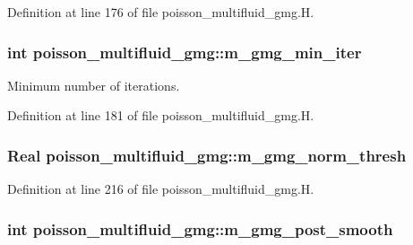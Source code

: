 Definition at line 176 of file poisson\+\_\+multifluid\+\_\+gmg.\+H.

\subsubsection[{\texorpdfstring{m\+\_\+gmg\+\_\+min\+\_\+iter}{m_gmg_min_iter}}]{\setlength{\rightskip}{0pt plus 5cm}int poisson\+\_\+multifluid\+\_\+gmg\+::m\+\_\+gmg\+\_\+min\+\_\+iter\hspace{0.3cm}{\ttfamily [protected]}}\hypertarget{classpoisson__multifluid__gmg_afbd5549164a894e68cd4355111b95b1e}{}\label{classpoisson__multifluid__gmg_afbd5549164a894e68cd4355111b95b1e}


Minimum number of iterations. 



Definition at line 181 of file poisson\+\_\+multifluid\+\_\+gmg.\+H.

\subsubsection[{\texorpdfstring{m\+\_\+gmg\+\_\+norm\+\_\+thresh}{m_gmg_norm_thresh}}]{\setlength{\rightskip}{0pt plus 5cm}Real poisson\+\_\+multifluid\+\_\+gmg\+::m\+\_\+gmg\+\_\+norm\+\_\+thresh\hspace{0.3cm}{\ttfamily [protected]}}\hypertarget{classpoisson__multifluid__gmg_aedad644585e19b2e21fa96484f74cbaa}{}\label{classpoisson__multifluid__gmg_aedad644585e19b2e21fa96484f74cbaa}


Definition at line 216 of file poisson\+\_\+multifluid\+\_\+gmg.\+H.

\subsubsection[{\texorpdfstring{m\+\_\+gmg\+\_\+post\+\_\+smooth}{m_gmg_post_smooth}}]{\setlength{\rightskip}{0pt plus 5cm}int poisson\+\_\+multifluid\+\_\+gmg\+::m\+\_\+gmg\+\_\+post\+\_\+smooth\hspace{0.3cm}{\ttfamily [protected]}}\hypertarget{classpoisson__multifluid__gmg_ad81b89116e64878e9c01423b9c3718e7}{}\label{classpoisson__multifluid__gmg_ad81b89116e64878e9c01423b9c3718e7}


